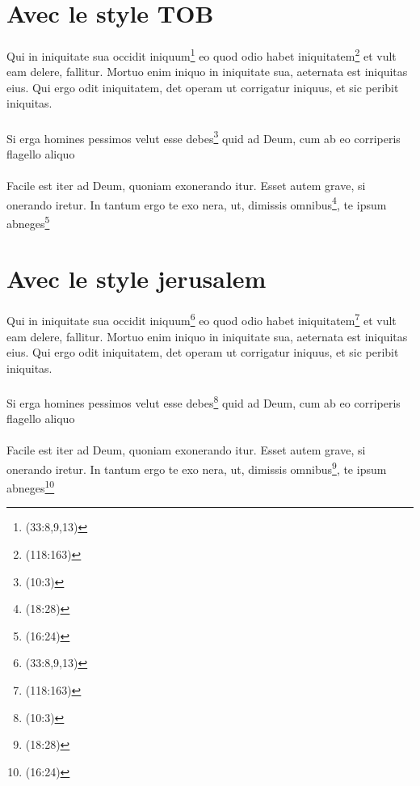 \documentclass[12pt]{article}
\begin{document}
\section{Avec le style TOB}
\paragraph{}
Qui in iniquitate sua occidit iniquum\footnote{
(33:8,9,13)}  eo quod odio habet iniquitatem\footnote{(118:163)
} et vult eam delere, fallitur. Mortuo enim iniquo in
iniquitate sua, aeternata est iniquitas eius. Qui ergo odit iniquitatem, det operam ut corrigatur iniquus, et sic peribit iniquitas.
\paragraph{}
Si erga homines pessimos velut esse debes\footnote{(10:3)} quid ad Deum, cum ab eo corriperis flagello aliquo
\paragraph{}
Facile est iter ad Deum, quoniam exonerando itur.
Esset autem grave, si onerando iretur. In tantum ergo te exo nera, ut, dimissis omnibus\footnote{(18:28)}, te ipsum abneges\footnote{(16:24)}\cite{guigues2001}
\newpage{}
\paragraph{}
\section{Avec le style jerusalem}
Qui in iniquitate sua occidit iniquum\footnote{
(33:8,9,13)}  eo quod odio habet iniquitatem\footnote{(118:163)
} et vult eam delere, fallitur. Mortuo enim iniquo in
iniquitate sua, aeternata est iniquitas eius. Qui ergo odit iniquitatem, det operam ut corrigatur iniquus, et sic peribit iniquitas.
\paragraph{}
Si erga homines pessimos velut esse debes\footnote{(10:3)} quid ad Deum, cum ab eo corriperis flagello aliquo
\paragraph{}
Facile est iter ad Deum, quoniam exonerando itur.
Esset autem grave, si onerando iretur. In tantum ergo te exo nera, ut, dimissis omnibus\footnote{(18:28)}, te ipsum abneges\footnote{(16:24)}\cite{guigues2001}
\newpage{}
\end{document}
